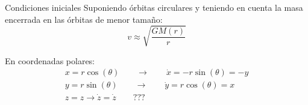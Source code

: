 \documentclass[handout]{beamer}
\begin{document}
\begin{frame}{Condiciones iniciales}
	Suponiendo \'orbitas circulares y teniendo en cuenta la masa encerrada en las \'orbitas de menor tama\~no:
	\begin{equation}
		v \approx \sqrt{\dfrac{GM(r)}{r}}
	\end{equation}\pause
	
	En coordenadas polares:
	\begin{equation}
		\begin{matrix}
			x = r\cos(\theta) \qquad \longrightarrow \qquad \dot{x} = -r\sin(\theta) = -y \\
			y = r\sin(\theta) \qquad \longrightarrow \qquad \dot{y} = r\cos(\theta) = x\\
			z = z \longrightarrow \dot{z} = \dot{z} \qquad??? \\
		\end{matrix}
	\end{equation}
\end{frame}
\end{document}
